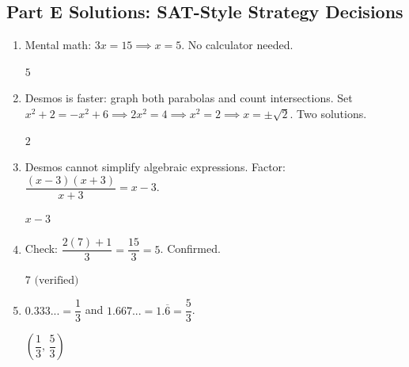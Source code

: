 \documentclass[14pt]{extarticle}
\begin{document}
\subsection*{Part E Solutions: SAT-Style Strategy Decisions}
\begin{enumerate}
  \item Mental math: \(3x = 15 \implies x = 5\). No calculator needed.

  \(\boxed{5}\)

  \item Desmos is faster: graph both parabolas and count intersections. Set \(x^2 + 2 = -x^2 + 6 \implies 2x^2 = 4 \implies x^2 = 2 \implies x = \pm\sqrt{2}\). Two solutions.

  \(\boxed{2}\)

  \item Desmos cannot simplify algebraic expressions. Factor: \(\dfrac{(x-3)(x+3)}{x+3} = x - 3\).

  \(\boxed{x - 3}\)

  \item Check: \(\dfrac{2(7) + 1}{3} = \dfrac{15}{3} = 5\). Confirmed.

  \(\boxed{7 \text{ (verified)}}\)

  \item \(0.333... = \dfrac{1}{3}\) and \(1.667... = 1.\overline{6} = \dfrac{5}{3}\).

  \(\boxed{\left(\dfrac{1}{3},\, \dfrac{5}{3}\right)}\)
\end{enumerate}

\end{document}

